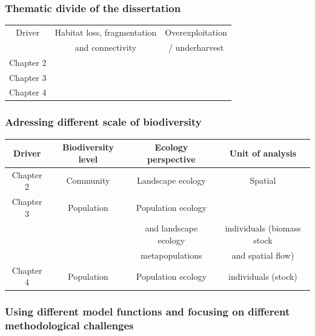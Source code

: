 \subsubsection*{Thematic divide of the dissertation}

\begin{table}[H]
\centering

\begin{tabular}{c|c|c}
Driver & Habitat loss, fragmentation& Overexploitation \\
       &  and connectivity   & / underharvest \\
\hline
Chapter 2      & \cellcolor{verylightgray}                    &                                \\
\hline
Chapter 3      & \cellcolor{verylightgray}                    & \cellcolor{verylightgray}      \\
\hline
Chapter 4      &                                              & \cellcolor{verylightgray}   \\   
\hline
\end{tabular}
\end{table}


\subsubsection*{Adressing different scale of biodiversity}


\begin{table}[H]
\centering

\begin{tabular}{c|c|c|c}
Driver &  Biodiversity level & Ecology perspective  & Unit of analysis \\
\hline
Chapter 2      &  Community         &             Landscape ecology                   & Spatial \\
\hline
Chapter 3      &  Population        &  Population ecology   \\
               &                    & and landscape ecology & individuals (biomass stock \\
			   & 				   &  metapopulations  &  and spatial flow) \\
\hline
Chapter 4      &      Population    & Population ecology  & individuals (stock)   \\   
\hline
\end{tabular}
\end{table}

\subsubsection*{Using different model functions and focusing on different methodological challenges}

